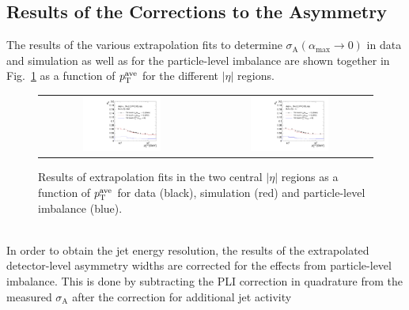 \subsection{Results of the Corrections to the Asymmetry}
\label{subsec:jer_corrections_results} 
The results of the various extrapolation fits to determine $ \sigma_\mathrm{A}(\alpha_\mathrm{max} \rightarrow 0)$ in data and simulation as well as for the particle-level imbalance are shown together in Fig.~\ref{fig:fit-results} as a function of $p_{\text{T}}^\mathrm{ave}$ for the different $|\eta|$ regions. 
\begin{figure}[!htp]
  \centering
  \begin{tabular}{cc}
                \includegraphics[width=0.49\textwidth]{figures/Extrapol_Eta0_final_nominal_v4b.pdf} &
                \includegraphics[width=0.49\textwidth]{figures/Extrapol_Eta1_final_nominal_v4b.pdf} \\
  \end{tabular}
  \caption{Results of extrapolation fits in the two central $|\eta|$ regions as a function of $p_{\text{T}}^\mathrm{ave}$ for data (black), simulation (red) and particle-level imbalance (blue).}
  \label{fig:fit-results}
\end{figure}
\\
In order to obtain the jet energy resolution, the results of the extrapolated detector-level asymmetry widths are corrected for the effects from particle-level imbalance. This is done by subtracting the PLI correction in quadrature from the measured $\sigma_\mathrm{A}$ after the correction for additional jet activity 

